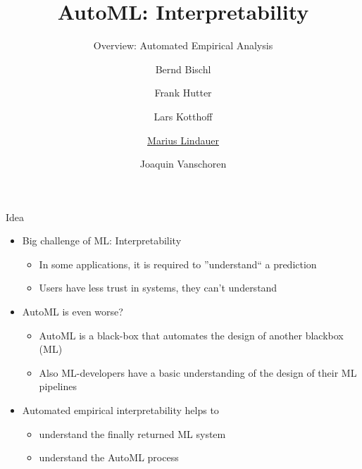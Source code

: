 


\title[AutoML: Interpretability]{AutoML: Interpretability}
\subtitle{Overview: Automated Empirical Analysis}
\author[Marius Lindauer]{Bernd Bischl \and Frank Hutter \and Lars Kotthoff\newline \and \underline{Marius Lindauer} \and Joaquin Vanschoren}
\institute{}
\date{}





	
	\maketitle
	

\begin{frame}[c]{Idea}


\begin{itemize}
	\item Big challenge of ML: Interpretability
	\begin{itemize}
		\item In some applications, it is required to ''understand`` a prediction 
		\item Users have less trust in systems, they can't understand
	\end{itemize}

	\bigskip
	\pause
	\item AutoML is even worse?
	\begin{itemize}
		\item AutoML  is a black-box that automates the design  of another blackbox (ML)
		\item Also ML-developers have a basic understanding of the design of their ML pipelines
	\end{itemize}

	\bigskip
	\item Automated empirical interpretability helps to
	\begin{itemize}
		\item understand the finally returned ML system
		\item understand the AutoML process
	\end{itemize}

\end{itemize}

\end{frame}

